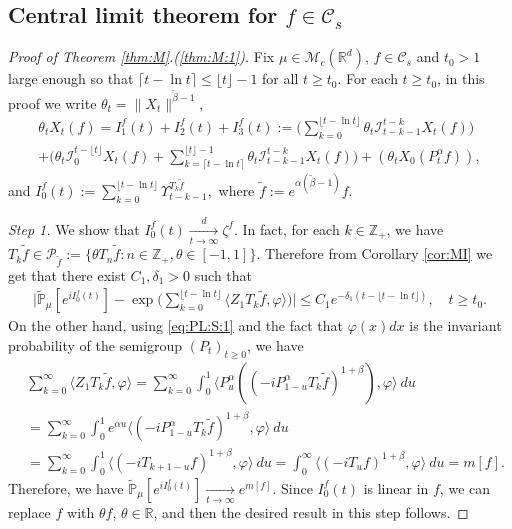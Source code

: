\documentclass[EJP]{ejpecp} %
\begin{document}
\subsection{Central limit theorem for $f\in \mathcal C_s$}
\label{sec: small rate}

\begin{proof}[Proof of Theorem \ref{thm:M}.(\ref{thm:M:1})]
	Fix $\mu\in \mathcal M_c(\mathbb R^d)$, $f\in \mathcal C_s$ and $t_0 > 1$  large enough so that $ \lceil t - \ln t\rceil \leq \lfloor t \rfloor - 1$ for all $t\geq t_0$.
  For each $t\geq t_0$, in this proof we write $\theta_t = \|X_t\|^{\tilde \beta - 1}$,
  \begin{multline}
    \label{eq:PM:CLTS:1}
    \theta_t  X_t(f)
    = I^f_1(t) + I^f_2(t) + I^f_3(t)
    := \Big(\sum_{k=0}^{\lfloor t-\ln t \rfloor} \theta_t \mathcal I_{t-k-1}^{t-k} X_t(f) \Big)\\
    + \Big( \theta_t \mathcal I_0^{t-\lfloor t \rfloor} X_t(f)   + \sum_{k=\lceil t-\ln t \rceil}^{\lfloor t \rfloor-1} \theta_t \mathcal I_{t-k-1}^{t-k} X_t(f) \Big) + (\theta_t X_0(P_t^\alpha f) ),
  \end{multline}
  and $ I^f_0(t) := \sum_{k=0}^{\lfloor t-\ln t \rfloor} \Upsilon_{t-k-1}^{T_k \tilde f},$ where $\tilde f:= e^{\alpha(\tilde \beta - 1)} f$.

  \emph{Step 1.} We show that $I^f_0(t) \xrightarrow[t\to \infty]{d} \zeta^f$.
  In fact, for each $k \in \mathbb Z_+$, we have  $T_{k} \tilde f \in \mathcal P_{\tilde f}:=\{\theta T_n \tilde f: n \in \mathbb Z_+, \theta \in [-1,1]\}$.
  Therefore from Corollary \ref{cor:MI} we get that there exist $C_1,\delta_1 > 0$ such that
  \begin{align}
    \Big|\mathbb{\widetilde{P}}_{\mu} [e^{i I^f_0(t)} ]-\exp\Big(\sum_{k=0}^{\lfloor t-\ln t \rfloor} \langle Z_1T_{k}\tilde f, \varphi\rangle \Big)\Big|
    \leq C_1 e^{-\delta_1(t - \lfloor t - \ln t\rfloor)},
    \quad t\geq t_0.
  \end{align}
  On the other hand, using \eqref{eq:PL:S:1} and the fact that $\varphi(x)dx$ is the invariant probability of the semigroup $(P_t)_{t\geq 0}$, we have
  \begin{align}
    \label{eq:PM:CLTS:2}
    & \sum_{k=0}^\infty \langle Z_1 T_{k} \tilde f, \varphi \rangle
    = \sum_{k=0}^\infty \int_0^1 \langle P_u^\alpha ((-iP_{1 - u}^\alpha T_k \tilde f)^{1+\beta}), \varphi\rangle ~du
    \\& = \sum_{k=0}^\infty \int_0^1 e^{\alpha u} \langle  (-iP_{1 - u}^\alpha T_{k}\tilde f)^{1+\beta}, \varphi \rangle ~du
    \\& = \sum_{k=0}^\infty \int_0^1 \langle  (-iT_{k+1 - u} f)^{1+\beta}, \varphi\rangle~du
    = \int_0^\infty \langle  (-iT_{u} f)^{1+\beta}, \varphi\rangle~du = m[f].
  \end{align}
  Therefore, we have $\mathbb{\widetilde{P}}_{\mu} [e^{i I^f_0(t)} ] \xrightarrow[t\to \infty]{} e^{m[f]}$. Since $I_0^f(t)$ is linear in $f$, we can replace $f$ with $\theta f$, $\theta \in \mathbb R$, and then the desired result in this step follows.


\end{proof}
\end{document}
